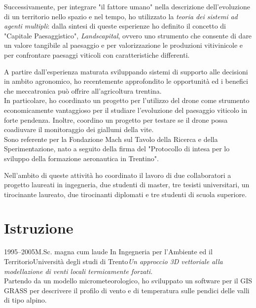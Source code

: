 \documentclass{curriculum}
\begin{document}
\begin{description}[style= unboxed, leftmargin= 6 pt, topsep= -3 pt, parsep= 3 pt, itemsep= 2pt]
     Successivamente, per integrare "il fattore umano" nella descrizione dell'evoluzione di un territorio nello spazio e nel tempo, ho utilizzato la \textit{teoria dei sistemi ad agenti multipli}: dalla sintesi di queste esperienze ho definito il concetto  di "Capitale Paesaggistico", \textit{Landscapital}, ovvero uno strumento che consente di dare un valore tangibile al paesaggio e per valorizzazione le produzioni vitivinicole e per confrontare paesaggi viticoli con caratteristiche differenti. 
     \item[Droni e agricoltura di precisione] A partire dall'esperienza maturata sviluppando sistemi di supporto alle decisioni in ambito agronomico, ho recentemente approfondito le opportunità ed i benefici che meccatronica può offrire all'agricoltura trentina.\\
     In particolare, ho coordinato un progetto per l'utilizzo del drone come strumento economicamente vantaggioso per il studiare l'evoluzione del paesaggio viticolo in forte pendenza. Inoltre, coordino un progetto per testare se il drone possa coadiuvare il monitoraggio dei giallumi della vite.\\
     Sono referente per la Fondazione Mach sul Tavolo della Ricerca e della Sperimentazione, nato a seguito della firma del "Protocollo di intesa per lo sviluppo della formazione aeronautica in Trentino".
    \end{description}
    \vspace{3pt}
    Nell'ambito di queste attività ho coordinato il lavoro di due collaboratori a progetto laureati in ingegneria, due studenti di master, tre tesisti universitari, un tirocinante laureato, due tirocinanti diplomati e tre studenti di scuola superiore.
    
    \newpage
    
    \section{Istruzione}
    \begin{entrylist}
    \entry
        {1995--2005}{M.Sc. magna cum laude {\normalfont In Ingegneria per l'Ambiente ed il Territorio}}{Università degli studi di Trento}{\emph{Un approccio 3D vettoriale alla modellazione di venti locali termicamente forzati.}\hfill\vspace{2pt}\\
        Partendo da un modello micrometeorologico, ho sviluppato un software per il GIS GRASS per descrivere il profilo di vento e di temperatura sulle pendici delle valli di tipo alpino.}
    \end{entrylist}
    
\end{document}
